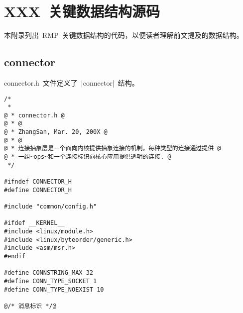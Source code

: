 \section{XXX~关键数据结构源码}

本附录列出~RMP~关键数据结构的代码，以便读者理解前文提及的数据结构。

\subsection{connector}

connector.h~文件定义了~|connector|~结构。

\begin{sourcelist}\begin{lstlisting}
/*
 *
@ * connector.h @
@ * @
@ * ZhangSan, Mar. 20, 200X @
@ * @
@ * 连接抽象层是一个面向内核提供抽象连接的机制，每种类型的连接通过提供 @
@ * 一组~ops~和一个连接标识向核心应用提供透明的连接. @
 */

#ifndef CONNECTOR_H
#define CONNECTOR_H

#include "common/config.h"

#ifdef __KERNEL__
#include <linux/module.h>
#include <linux/byteorder/generic.h>
#include <asm/msr.h>
#endif

#define CONNSTRING_MAX 32
#define CONN_TYPE_SOCKET 1
#define CONN_TYPE_NOEXIST 10

@/* 消息标识 */@

\end{lstlisting}\end{sourcelist}

